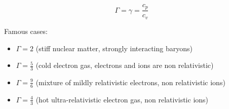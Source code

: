 \documentclass[12pt]{report}
\begin{document}
	\begin{equation}\Gamma = \gamma = \frac{c_p}{c_v}\end{equation}
	
	Famous cases:
	\begin{itemize}
		\item $\Gamma = 2$ (stiff nuclear matter, strongly interacting baryons)
		\item $\Gamma = \frac{5}{3}$ (cold electron gas, electrons and ions are non relativistic)
		\item $\Gamma = \frac{9}{6}$ (mixture of mildly relativistic electrons, non relativistic ions)
		\item $\Gamma = \frac{4}{3}$ (hot ultra-relativistic electron gas, non relativistic ions)
	\end{itemize}
	
\end{document}
